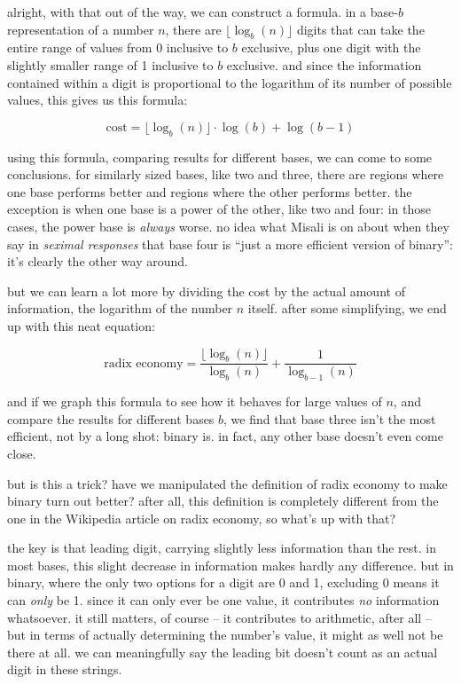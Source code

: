 \documentclass[../best.tex]{subfiles}
\begin{document}
alright, with that out of the way, we can construct a formula. in a base-$b$ representation of a number $n$, there are $\lfloor \log_b(n) \rfloor$ digits that can take the entire range of values from 0 inclusive to $b$ exclusive, plus one digit with the slightly smaller range of 1 inclusive to $b$ exclusive. and since the information contained within a digit is proportional to the logarithm of its number of possible values,\myfootnote{} this gives us this formula:

\begin{equation*}
	\text{cost} = \lfloor \log_b(n) \rfloor \cdot \log(b) + \log(b - 1)
\end{equation*}

using this formula, comparing results for different bases, we can come to some conclusions. for similarly sized bases, like two and three, there are regions where one base performs better and regions where the other performs better. the exception is when one base is a power of the other, like two and four: in those cases, the power base is \emph{always} worse.\myfootnote{} no idea what Misali is on about when they say in {\it seximal responses} that base four is ``just a more efficient version of binary'': it's clearly the other way around.\myfootnote{}

but we can learn a lot more by dividing the cost by the actual amount of information, the logarithm of the number $n$ itself. after some simplifying, we end up with this neat equation:\myfootnote{}

\begin{equation*}
	\text{radix economy} = \frac{\lfloor \log_b(n) \rfloor}{\log_b(n)} + \frac{1}{\log_{b-1}(n)}
\end{equation*}

and if we graph this formula to see how it behaves for large values of $n$, and compare the results for different bases $b$, we find that base three isn't the most efficient, not by a long shot: binary is.\myfootnote{} in fact, any other base doesn't even come close.

but is this a trick? have we manipulated the definition of radix economy to make binary turn out better? after all, this definition is completely different from the one in the Wikipedia article on radix economy, so what's up with that?\myfootnote{}

the key is that leading digit, carrying slightly less information than the rest. in most bases, this slight decrease in information makes hardly any difference. but in binary, where the only two options for a digit are 0 and 1, excluding 0 means it can \emph{only} be 1. since it can only ever be one value, it contributes \emph{no} information whatsoever.\myfootnote{} it still matters, of course -- it contributes to arithmetic, after all -- but in terms of actually determining the number's value, it might as well not be there at all. we can meaningfully say the leading bit doesn't count as an actual digit in these strings.\myfootnote{}
\end{document}

